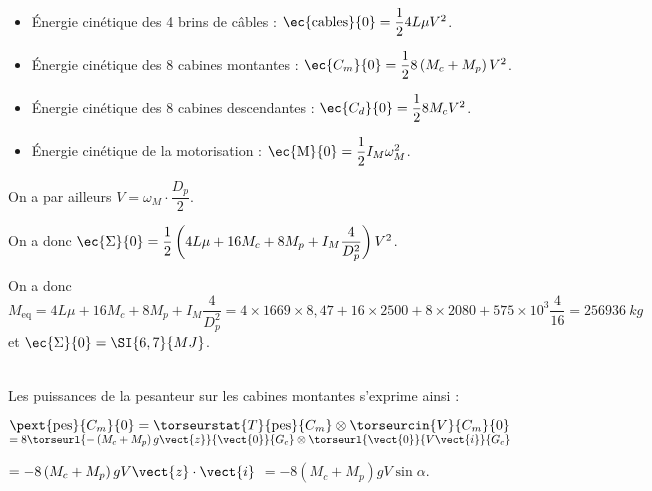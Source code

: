 \begin{multicols}{2}
\ifprof\begin{corrige} ~\\
\begin{itemize}
\item Énergie cinétique des 4 brins de câbles : $\ec{\text{cables}}{0} = \dfrac{1}{2}4 L \mu V^2$.
\item Énergie cinétique des 8 cabines montantes : $ \ec{{C_m}}{0} = \dfrac{1}{2}8  \left(M_c +  M_p\right) V^2$.
\item Énergie cinétique des 8 cabines descendantes : $\ec{{C_d}}{0} = \dfrac{1}{2}8  M_c V^2$.
\item Énergie cinétique de la motorisation : $\ec{\text{M}}{0} = \dfrac{1}{2}I_M  \omega_M^2$.
\end{itemize}

On a par ailleurs  $V=\omega_M \cdot \dfrac{D_p}{2}$.

On a donc $\ec{\Sigma}{0}= \dfrac{1}{2}\left(4 L \mu + 16 M_c + 8 M_p  + I_M\dfrac{4}{D_p^2}\right)V^2$.

On a donc $M_{\text{eq}}=4 L \mu + 16 M_c + 8 M_p  + I_M\dfrac{4}{D_p^2} = 4\times 1669 \times 8,47 + 16 \times 2500  + 8 \times 2080  + 575 \times 10^3 \dfrac{4}{16} = \SI{256936}{kg}$ et $\ec{\Sigma}{0}=\SI{6,7}{MJ}$.

\end{corrige}\else\fi


\ifprof\begin{corrige} ~\\

Les puissances de la pesanteur sur les cabines montantes s'exprime ainsi : 

$\pext{\text{pes}}{C_m}{0} = \torseurstat{T}{\text{pes}}{C_m} \otimes \torseurcin{V}{C_m}{0}$
$ = 8 \torseurl{-\left(M_c+M_p\right)g \vect{z}}{\vect{0}}{G_c} \otimes \torseurl{\vect{0}}{V\vect{i}}{G_c}	$

$ = -8\left(M_c+M_p\right)gV\vect{z} \cdot \vect{i}$
$ = -8\left(M_c+M_p\right)gV \sin \alpha$.



\end{corrige}
\end{multicols}
